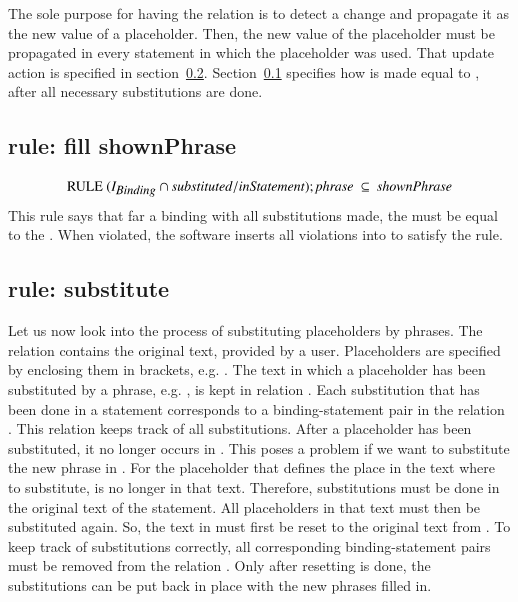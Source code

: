 \documentclass{elsarticle}
\begin{document}
	The sole purpose for having the relation  is to detect a change
	and propagate it as the new value of a placeholder.
	Then, the new value of the placeholder must be propagated in every statement in which the placeholder was used.
	That update action is specified in section~\ref{rule: substitute}.
	Section~\ref{rule: fill shownPhrase} specifies how  is made equal to ,
	after all necessary substitutions are done.

\subsection{rule: fill shownPhrase}
\label{rule: fill shownPhrase}

\[\text{RULE}\ (\ident{Binding}\cap\id{substituted}/\id{inStatement} );\id{phrase}\ \subs\ \id{shownPhrase} \]
        This rule says that far a binding with all substitutions made, the  must be equal to the .
	When violated, the software inserts all violations into  to satisfy the rule.

\subsection{rule: substitute}
\label{rule: substitute}
	Let us now look into the process of substituting placeholders by phrases.
	The relation  contains the original text, provided by a user.
	Placeholders are specified by enclosing them in brackets,
	e.g. .
	The text in which a placeholder has been substituted by a phrase,
	e.g. ,
	is kept in relation .
	Each substitution that has been done in a statement corresponds to a binding-statement pair in the relation .
	This relation keeps track of all substitutions.
	After a placeholder has been substituted, it no longer occurs in .
	This poses a problem if we want to substitute the new phrase in .
    For the placeholder that defines the place in the text where to substitute, is no longer in that text.
	Therefore, substitutions must be done in the original text of the statement.
	All placeholders in that text must then be substituted again.
	So, the text in  must first be reset to the original text from .
	To keep track of substitutions correctly, all corresponding binding-statement pairs must be removed from the relation .
	Only after resetting is done, the substitutions can be put back in place with the new phrases filled in.
	
\end{document}
